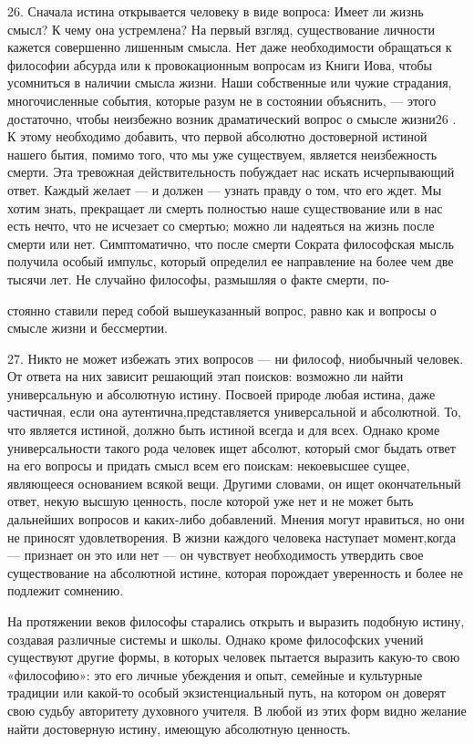 \documentclass[a5paper,10pt]{article}
\begin{document}
26. Сначала истина открывается человеку в виде вопроса: Имеет ли жизнь смысл? К
чему она устремлена? На первый взгляд, существование личности кажется
совершенно лишенным смысла. Нет даже необходимости обращаться к философии
абсурда или к провокационным вопросам из Книги Иова, чтобы усомниться в наличии
смысла жизни. Наши собственные или чужие страдания, многочисленные события,
которые разум не в состоянии объяснить, — этого достаточно, чтобы неизбежно
возник драматический вопрос о смысле жизни26 . К этому необходимо добавить, что
первой абсолютно достоверной истиной нашего бытия, помимо того, что мы уже
существуем, является неизбежность смерти. Эта тревожная действительность
побуждает нас искать исчерпывающий ответ. Каждый желает — и должен — узнать
правду о том, что его ждет. Мы хотим знать, прекращает ли смерть полностью наше
существование или в нас есть нечто, что не исчезает со смертью; можно ли
надеяться на жизнь после смерти или нет. Симптоматично, что после смерти
Сократа философская мысль получила особый импульс, который определил ее
направление на более чем две тысячи лет. Не случайно философы, размышляя о
факте смерти, по-

стоянно ставили перед собой вышеуказанный вопрос, равно как и вопросы о смысле
жизни и бессмертии.

27. Никто не может избежать этих вопросов — ни философ, ниобычный человек. От
ответа на них зависит решающий этап поисков: возможно ли найти универсальную и
абсолютную истину. Посвоей природе любая истина, даже частичная, если она
аутентична,представляется универсальной и абсолютной. То, что является истиной,
должно быть истиной всегда и для всех. Однако кроме универсальности такого рода
человек ищет абсолют, который смог быдать ответ на его вопросы и придать смысл
всем его поискам: некоевысшее сущее, являющееся основанием всякой вещи. Другими
словами, он ищет окончательный ответ, некую высшую ценность, после которой уже
нет и не может быть дальнейших вопросов и каких-либо добавлений. Мнения могут
нравиться, но они не приносят удовлетворения. В жизни каждого человека
наступает момент,когда — признает он это или нет — он чувствует необходимость
утвердить свое существование на абсолютной истине, которая порождает
уверенность и более не подлежит сомнению.

На протяжении веков философы старались открыть и выразить подобную истину,
создавая различные системы и школы. Однако кроме философских учений существуют
другие формы, в которых человек пытается выразить какую-то свою «философию»:
это его личные убеждения и опыт, семейные и культурные традиции или какой-то
особый экзистенциальный путь, на котором он доверят свою судьбу авторитету
духовного учителя. В любой из этих форм видно желание найти достоверную истину,
имеющую абсолютную ценность.
\end{document}
